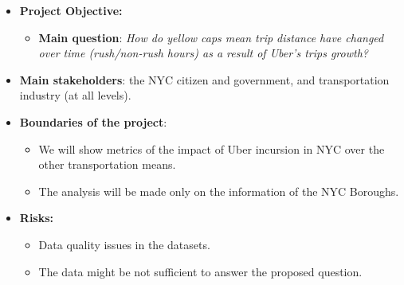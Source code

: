 \documentclass[11pt]{article}
\begin{document}
\begin{itemize}

\item \textbf{Project Objective:}
\begin{itemize}
\item \textbf{Main question}: \textit{How do yellow caps mean trip distance have changed over time (rush/non-rush hours) as a result of Uber's trips growth?} \\ 
\end{itemize}

\item \textbf{Main stakeholders}: the NYC citizen and government, and transportation industry (at all levels).

\item \textbf{Boundaries of the project}:

\begin{itemize}
\item We will show metrics of the impact of Uber incursion in NYC over the other transportation means.
\item The analysis will be made only on the information of the NYC Boroughs.
\end{itemize}

\item \textbf{Risks:} 
\begin{itemize}
\item Data quality issues in the datasets.
\item The data might be not sufficient to answer the proposed question. 
\end{itemize}

\end{itemize}
\end{document}
